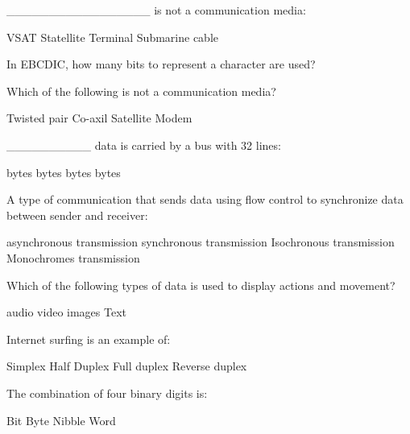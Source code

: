 \documentclass{exam}
\begin{document}
\begin{questions}
\_\_\_\_\_\_\_\_\_\_\_\_\_\_\_\_\_ is not a communication media:\\
\begin{oneparchoices}
\choice VSAT
\choice Statellite
\choice Terminal
\choice Submarine cable
\end{oneparchoices}
\question 

In EBCDIC, how many bits to represent a character are used?\\
\begin{oneparchoices}
\end{oneparchoices}
\question 

Which of the following is not a communication media?\\
\begin{oneparchoices}
\choice Twisted pair
\choice Co-axil
\choice Satellite
\choice Modem
\end{oneparchoices}
\question 

\_\_\_\_\_\_\_\_\_\_ data is carried by a bus with 32 lines:\\
\begin{oneparchoices}
 bytes
 bytes
 bytes
 bytes
\end{oneparchoices}
\question 

A type of communication that sends data using flow control to synchronize data between sender and receiver:\\
\begin{oneparchoices}
\choice asynchronous transmission
\choice synchronous transmission
\choice Isochronous transmission
\choice Monochromes transmission
\end{oneparchoices}
\question 

Which of the following types of data is used to display actions and movement?\\
\begin{oneparchoices}
\choice audio
\choice video
\choice images
\choice Text
\end{oneparchoices}
\question 

Internet surfing is an example of:\\
\begin{oneparchoices}
\choice Simplex
\choice Half Duplex
\choice Full duplex
\choice Reverse duplex
\end{oneparchoices}
\question 

The combination of four binary digits is:\\
\begin{oneparchoices}
\choice Bit
\choice Byte
\choice Nibble
\choice Word
\end{oneparchoices}
\question 


\end{questions}
\end{document}
